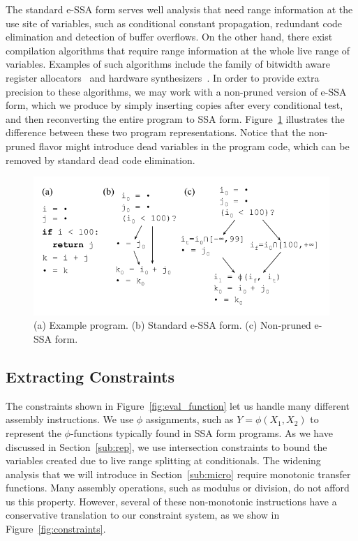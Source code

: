\documentclass[preprint]{sigplanconf}
\begin{document}
The standard e-SSA form serves well analysis that need range information
at the use site of variables, such as conditional constant propagation,
redundant code elimination and detection of buffer overflows.
On the other hand, there exist compilation algorithms that require range
information at the whole live range of variables.
Examples of such algorithms include the family of
bitwidth aware register allocators~\cite{Barik06,Tallam03,Pereira08} and
hardware synthesizers~\cite{Cong05,Mahlke01,Stephenson00}.
In order to provide extra precision to these algorithms, we may work with a
non-pruned version of e-SSA form, which we produce by simply inserting copies
after every conditional test, and then reconverting the entire program to
SSA form.
Figure~\ref{fig:ex_non_pruned} illustrates the difference between these two
program representations.
Notice that the non-pruned flavor might introduce dead variables in the
program code, which can be removed by standard dead code elimination.

\begin{figure}[t!]
\begin{center}
\includegraphics[width=\columnwidth]{images/ex_non_pruned}
\end{center}
\caption{\label{fig:ex_non_pruned}
(a) Example program.
(b) Standard e-SSA form.
(c) Non-pruned e-SSA form.}
\end{figure}

\subsection{Extracting Constraints}
\label{sub:constraints}

The constraints shown in Figure~\ref{fig:eval_function} let us handle
many different assembly instructions.
We use $\phi$ assignments, such as $Y = \phi(X_1, X_2)$ to represent
the $\phi$-functions typically found in SSA form programs.
As we have discussed in Section~\ref{sub:rep}, we use intersection
constraints to bound the variables created due to live range splitting
at conditionals.
The widening analysis that we will introduce in Section~\ref{sub:micro}
require monotonic transfer functions.
Many assembly operations, such as modulus or division, do not afford us
this property.
However, several of these non-monotonic instructions have a conservative
translation to our constraint system, as we show in
Figure~\ref{fig:constraints}.
\end{document}
